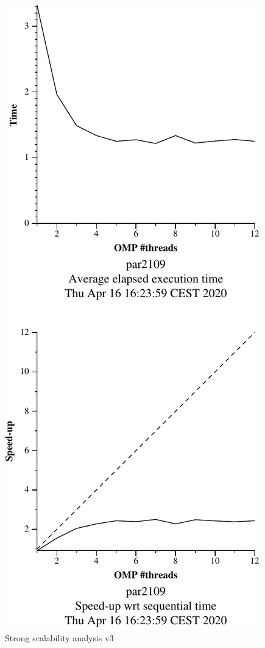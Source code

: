 \begin{figure}[H]
    \begin{minipage}{0.5\textwidth}
        \centering
        \includegraphics[width=0.7\linewidth]{plots/v3-crop.pdf}
        \caption{Strong scalability analysis v3}
        \label{fig:ssa_v3} 
    \end{minipage}
    \begin{minipage}{0.5\textwidth}
        \centering

\end{minipage}
\end{figure}
